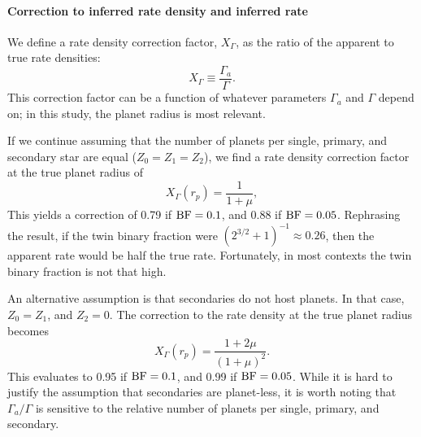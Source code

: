 \paragraph{Correction to inferred rate density and inferred rate}

We define a rate density correction factor, $X_\Gamma$, as the ratio of the 
apparent to true rate densities:
\begin{equation}
X_\Gamma \equiv \frac{\Gamma_a}{\Gamma}.
\end{equation}
This correction factor can be a function of whatever parameters $\Gamma_a$ and 
$\Gamma$ depend on; in this study, the planet radius is most relevant.

If we continue assuming that the number of planets per single, primary, and 
secondary star are equal ($Z_0=Z_1=Z_2$), we find a rate density correction 
factor at the true planet radius of
\begin{equation}
X_\Gamma(r_p) = \frac{1}{1+\mu},
\label{eq:Z_eq_model_1_correction}
\end{equation}
This yields a correction of 0.79 if ${\rm BF}=0.1$, and 0.88 if ${\rm 
BF}=0.05$.
Rephrasing the result, if the twin binary fraction were 
$(2^{3/2}+1)^{-1}\approx 0.26$, then the apparent rate would be half the true 
rate.
Fortunately, in most contexts the twin binary fraction is not that high.

An alternative assumption is that secondaries do not host planets. In that 
case, $Z_0=Z_1$, and $Z_2=0$. The correction to the rate density at the true 
planet radius becomes
\begin{equation}
X_\Gamma(r_p) = \frac{1+2\mu}{(1+\mu)^2}.
\end{equation}
This evaluates to 0.95 if ${\rm BF}=0.1$, and 0.99 if ${\rm BF}=0.05$.
While it is hard to justify the assumption that secondaries are planet-less, 
it is worth noting that $\Gamma_a/\Gamma$ is sensitive to the relative number 
of planets per single, primary, and secondary.